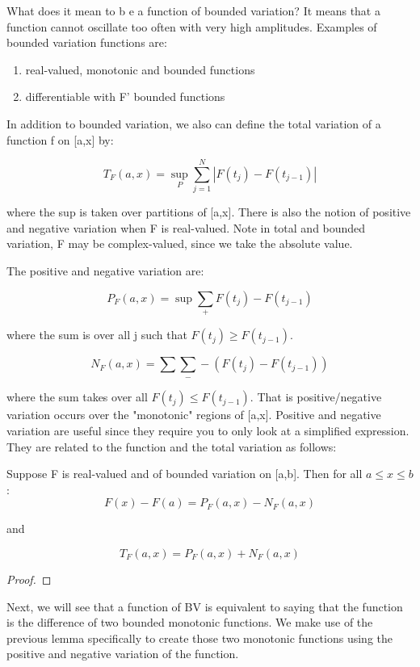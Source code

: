 \documentclass[class=article, crop=false]{standalone}
\begin{document}
			What does it mean to b e a function of bounded variation? It means that a function cannot oscillate too often with very high amplitudes. Examples of bounded variation functions are:

			\begin{enumerate}
				\item real-valued, monotonic and bounded functions
				\item differentiable with F' bounded functions
			\end{enumerate}

			In addition to bounded variation, we also can define the total variation of a function f on [a,x] by:

				$$T_F(a,x) = \sup_P \sum_{j=1}^N |F(t_j) - F(t_{j-1})|$$

			where the sup is taken over partitions of [a,x]. There is also the notion of positive and negative variation when F is real-valued. Note in total and bounded variation, F may be complex-valued, since we take the absolute value.

			The positive and negative variation are:

				$$P_F(a,x) = \sup \sum_+ F(t_j) - F(t_{j-1})$$

			where the sum is over all j such that $F(t_j) \ge F(t_{j-1})$. 

				$$N_F(a,x) = \sum \sum_- -(F(t_j) - F(t_{j-1}))$$

			where the sum takes over all $F(t_j) \le F(t_{j-1})$. That is positive/negative variation occurs over the "monotonic" regions of [a,x]. Positive and negative variation are useful since they require you to only look at a simplified expression. They are related to the function and the total variation as follows:

			\begin{lemma} 
				Suppose F is real-valued and of bounded variation on [a,b]. Then for all $a \le x \le b$:
					$$F(x) - F(a) = P_F(a,x) - N_F(a,x)$$

				and 

					$$T_F(a,x) = P_F(a,x) + N_F(a,x)$$
			\end{lemma}
			\begin{proof}
			\end{proof}

			Next, we will see that a function of BV is equivalent to saying that the function is the difference of two bounded monotonic functions. We make use of the previous lemma specifically to create those two monotonic functions using the positive and negative variation of the function.
\end{document}
